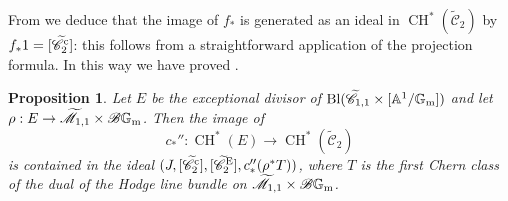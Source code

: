 \documentclass[a4paper, 10pt]{amsart}
\numberwithin{equation}{section}
\numberwithin{subsection}{section}
\newtheorem{proposition}[theorem]{Proposition}
\theoremstyle{definition}
\theoremstyle{remark}
\renewcommand{\mathcal}{\mathscr}
\renewcommand\AA{\mathbb{A}} \newcommand\BB{\mathbb{B}}
\newcommand\GG{\mathbb{G}} \newcommand\HH{\mathbb{H}}
\newcommand\rmm{\mathrm{m}} \newcommand\rmn{\mathrm{n}}
\newcommand{\gm}{\GG_{\rmm}}
\newcommand{\Mtilde}{\widetilde{\mathcal M}}
\newcommand{\Ctilde}{\widetilde{\mathcal C}}
\newcommand{\ch}[1][*]{\operatorname{CH}^{#1}}
\begin{document}
	From  we deduce that the image of $f_*$ is generated as an ideal in $\ch(\Ctilde_2)$ by $f_*1=[\Ctilde_2^{\rm c}]$: this follows from a straightforward application of the projection formula. In this way we have proved .
	
	\begin{proposition}\label{prop:exceptional}
		Let $E$ be the exceptional divisor of ${\rm{Bl}}(\Ctilde_{1,1}\times [\AA^1/\gm])$ and let $\rho:E\to\Mtilde_{1,1}\times\cB\gm$. Then the image of
		\[ c_*'':\ch(E) \longrightarrow \ch(\Ctilde_2) \]
		is contained in the ideal $(J,[\Ctilde_2^{\rm c}],[\Ctilde_2^{\rm E}],c_*''(\rho^*T))$, where $T$ is the first Chern class of the dual of the Hodge line bundle on $\Mtilde_{1,1}\times\cB\gm$.
	\end{proposition}
	
\end{document}
